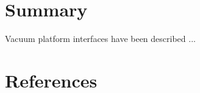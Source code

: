 \documentclass[12pt,a4paper]{article}
\begin{document}
\clearpage

\section{Summary}
\label{sec:Summary}

Vacuum platform interfaces have been described ...


\section*{References}

%
%
%


\end{document}
